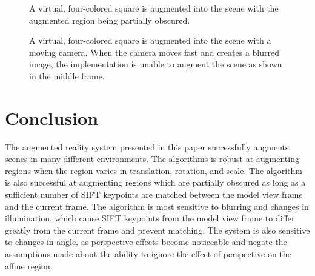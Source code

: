 \documentclass[oneside,11pt]{Latex/Classes/PhDthesisPSnPDF}
\begin{document}
\begin{figure}[h!]
  \caption{\label{fig_obscured_augmentation} A virtual, four-colored square is augmented into the scene with the augmented region being partially obscured.}
\end{figure}

\begin{figure}[h!]
  \caption{\label{fig_blurred_augmentation} A virtual, four-colored square is augmented into the scene with a moving camera.  When the camera moves fast and creates a blurred image, the implementation is unable to augment the scene as shown in the middle frame.}
\end{figure}

\chapter{Conclusion}

The augmented reality system presented in this paper successfully augments scenes in many different environments.  The algorithms is robust at augmenting regions when the region varies in translation, rotation, and scale.  The algorithm is also successful at augmenting regions which are partially obscured as long as a sufficient number of SIFT keypoints are matched between the model view frame and the current frame.  The algorithm is most sensitive to blurring and changes in illumination, which cause SIFT keypoints from the model view frame to differ greatly from the current frame and prevent matching.  The system is also sensitive to changes in angle, as perspective effects become noticeable and negate the assumptions made about the ability to ignore the effect of perspective on the affine region.  
\end{document}
